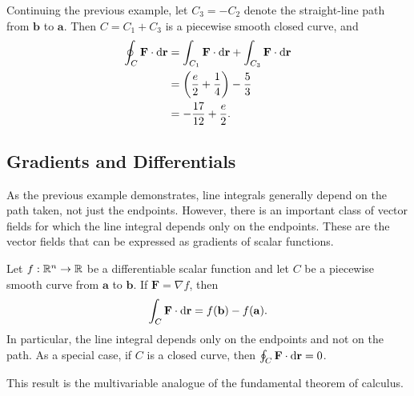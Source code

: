 \documentclass[a4paper]{article}
\begin{document}
\begin{eg}
  Continuing the previous example, let $C_3 = -C_2$ denote the straight-line path from $\mathbf{b}$ to $\mathbf{a}$. Then $C = C_1 + C_3$ is a piecewise smooth closed curve, and
  \begin{align*}
    \oint _C \mathbf{F}\cdot \mathrm{d} \mathbf{r} &= \int_{C_1} \mathbf{F}\cdot \mathrm{d} \mathbf{r} + \int_{C_3} \mathbf{F}\cdot \mathrm{d} \mathbf{r}\\
    &= \left(\frac{e}{2} + \frac{1}{4}\right) - \frac{5}{3}\\
    &= -\frac{17}{12} + \frac{e}{2}.
  \end{align*}
  \begin{center}
  \end{center}
\end{eg}

\subsection{Gradients and Differentials}
As the previous example demonstrates, line integrals generally depend on the path taken, not just the endpoints. However, there is an important class of vector fields for which the line integral depends only on the endpoints. These are the vector fields that can be expressed as gradients of scalar functions.

\begin{thm}
  Let $f: \mathbb{R}^n \to \mathbb{R}$ be a differentiable scalar function and let $C$ be a piecewise smooth curve from $\mathbf{a}$ to $\mathbf{b}$. If $\mathbf{F} = \nabla f$, then
  \[
    \int_C \mathbf{F}\cdot \mathrm{d} \mathbf{r} = f(\mathbf{b}) - f(\mathbf{a}).
  \]
  In particular, the line integral depends only on the endpoints and not on the path. As a special case, if $C$ is a closed curve, then $\oint_C \mathbf{F}\cdot \mathrm{d} \mathbf{r} = 0$.
\end{thm}

\begin{rmk}
  This result is the multivariable analogue of the fundamental theorem of calculus.
\end{rmk}
\end{document}
